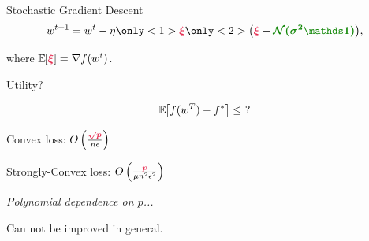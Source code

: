 \documentclass{beamer}
\begin{document}
\begin{frame}
  \vspace{2em}
  \begin{center}
  {\huge {}Stochastic Gradient Descent}
  \vspace{1em}
  \begin{align*}
    w^{t+1} = w^t - \eta
    \only<1>{\emphcol{\xi}}
    \only<2>{\left( \emphcol{\xi} + \emphcolb{\cN(\sigma^2\bbI)} \right)},
  \end{align*}

  \vspace{1em}

  where $\expec{}{\emphcol{\xi}} = \nabla f(w^t)$.
  \end{center}
\end{frame}


\begin{frame}
  \vspace{1em}

  \begin{center}
    \Huge Utility?
  \end{center}

  \begin{align*}
    \mathbb E_{} \hspace{-0.29em} \left[ f(w^T)-f^* \right] \le ~?
  \end{align*}
\end{frame}

\begin{frame}
  \huge
  \vspace{1em}

  \begin{center}

  Convex loss: $O\left( \frac{\emphcol{\sqrt{p}}}{n\epsilon} \right)$

  Strongly-Convex loss: $O\left( \frac{\emphcol{p}}{\mu n^2\epsilon^2} \right)$

  \vspace{2em} \pause

  \huge
  \emph{Polynomial dependence on $p$... \Frowny{}}

  \pause
  \vspace{0.5em}

  Can not be improved in general. \Frowny{}\Frowny{}
  \end{center}
\end{frame}
\end{document}
